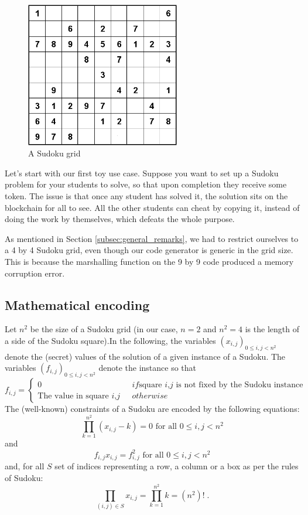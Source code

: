 \documentclass[10pt,a4paper]{article}
\begin{document}
	\begin{figure}[!h]
	\centering
	\includegraphics[width=0.6\textwidth]{Sudoku04}
	\caption{A Sudoku grid}
	\end{figure}


Let's start with our first toy use case. Suppose you want to set up a Sudoku problem for your students to solve, so that upon completion they receive some token. The issue is that once any student has solved it, the solution sits on the blockchain for all to see. All the other students can cheat by copying it, instead of doing the work by themselves, which defeats the whole purpose.

As mentioned in Section \ref{subsec:general_remarks}, we had to restrict ourselves to a 4 by 4 Sudoku grid, even though our code generator is generic in the grid size. This is because the marshalling function on the 9 by 9 code produced a memory corruption error.

\subsection{Mathematical encoding}
\label{subsec:math_enc}

Let $n^2$ be the size of a Sudoku grid (in our case, $n=2$ and $n^2 = 4$ is the length of a side of the Sudoku square).In the following, the variables $(x_{i,j})_{0 \leq i,j < n^2}$ denote the (secret) values of the solution of a given instance of a Sudoku. The variables $(f_{i,j})_{0 \leq i,j < n^2}$ denote the instance so that
\begin{equation}
f_{i,j} =
\begin{cases*}
0 & if \textrm{square $i$,$j$ is not fixed by the Sudoku instance}\\
\textrm{The value in square $i$,$j$ }        & otherwise
\end{cases*}
\end{equation}
The (well-known) constraints of a Sudoku are encoded by the following equations:
\[ \prod_{k=1}^{n^2} \left( x_{i,j} - k \right) = 0 \textrm{ for all $0 \leq i,j < n^2$} \]
and
\[ f_{i,j} x_{i,j} = f_{i,j}^2 \textrm{ for all $0 \leq i,j < n^2$}\]
and, for all $S$ set of indices representing a row, a column or a box as per the rules of Sudoku:
\[ \prod_{(i,j) \in S} x_{i,j} = \prod_{k=1}^{n^2} k = \left(n^2\right)! \; .\]
\end{document}
